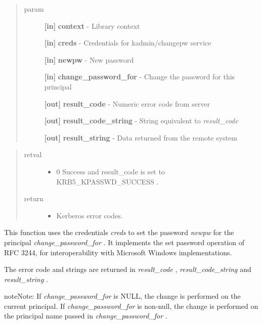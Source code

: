 \documentclass[letterpaper,10pt,english]{sphinxmanual}
\begin{document}
\begin{quote}\begin{description}
\item[{param}] \leavevmode
\textbf{{[}in{]}} \textbf{context} - Library context

\textbf{{[}in{]}} \textbf{creds} - Credentials for kadmin/changepw service

\textbf{{[}in{]}} \textbf{newpw} - New password

\textbf{{[}in{]}} \textbf{change\_password\_for} - Change the password for this principal

\textbf{{[}out{]}} \textbf{result\_code} - Numeric error code from server

\textbf{{[}out{]}} \textbf{result\_code\_string} - String equivalent to \emph{result\_code}

\textbf{{[}out{]}} \textbf{result\_string} - Data returned from the remote system

\end{description}\end{quote}
\begin{quote}\begin{description}
\item[{retval}] \leavevmode\begin{itemize}
\item {} 
0   Success and result\_code is set to KRB5\_KPASSWD\_SUCCESS .

\end{itemize}

\item[{return}] \leavevmode\begin{itemize}
\item {} 
Kerberos error codes.

\end{itemize}

\end{description}\end{quote}

This function uses the credentials \emph{creds} to set the password \emph{newpw} for the principal \emph{change\_password\_for} . It implements the set password operation of RFC 3244, for interoperability with Microsoft Windows implementations.

The error code and strings are returned in \emph{result\_code} , \emph{result\_code\_string} and \emph{result\_string} .

\begin{notice}{note}{Note:}
If \emph{change\_password\_for} is NULL, the change is performed on the current principal. If \emph{change\_password\_for} is non-null, the change is performed on the principal name passed in \emph{change\_password\_for} .
\end{notice}
\end{document}
